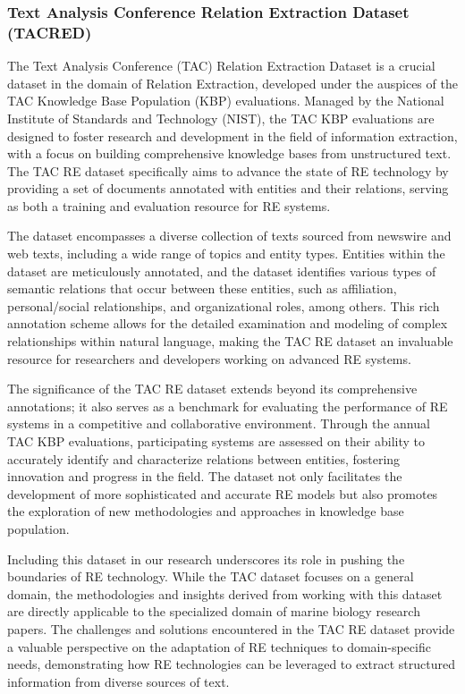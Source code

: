 \subsubsection{Text Analysis Conference Relation Extraction Dataset (TACRED)}
The Text Analysis Conference (TAC) Relation Extraction Dataset is a crucial dataset in the domain of Relation Extraction, developed under the auspices of the TAC Knowledge Base Population (KBP) evaluations. Managed by the National Institute of Standards and Technology (NIST), the TAC KBP evaluations are designed to foster research and development in the field of information extraction, with a focus on building comprehensive knowledge bases from unstructured text\cite{TAC}. The TAC RE dataset specifically aims to advance the state of RE technology by providing a set of documents annotated with entities and their relations, serving as both a training and evaluation resource for RE systems.

The dataset encompasses a diverse collection of texts sourced from newswire and web texts, including a wide range of topics and entity types. Entities within the dataset are meticulously annotated, and the dataset identifies various types of semantic relations that occur between these entities, such as affiliation, personal/social relationships, and organizational roles, among others. This rich annotation scheme allows for the detailed examination and modeling of complex relationships within natural language, making the TAC RE dataset an invaluable resource for researchers and developers working on advanced RE systems.

The significance of the TAC RE dataset extends beyond its comprehensive annotations; it also serves as a benchmark for evaluating the performance of RE systems in a competitive and collaborative environment. Through the annual TAC KBP evaluations, participating systems are assessed on their ability to accurately identify and characterize relations between entities, fostering innovation and progress in the field. The dataset not only facilitates the development of more sophisticated and accurate RE models but also promotes the exploration of new methodologies and approaches in knowledge base population.

Including this dataset in our research underscores its role in pushing the boundaries of RE technology. While the TAC dataset focuses on a general domain, the methodologies and insights derived from working with this dataset are directly applicable to the specialized domain of marine biology research papers. The challenges and solutions encountered in the TAC RE dataset provide a valuable perspective on the adaptation of RE techniques to domain-specific needs, demonstrating how RE technologies can be leveraged to extract structured information from diverse sources of text.

